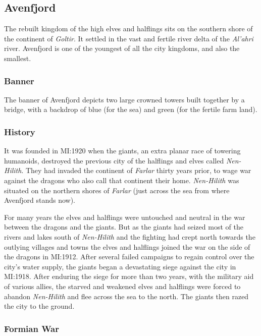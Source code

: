 \subsection*{Avenfjord}

The rebuilt kingdom of the high elves and halflings sits on the southern shore
of the continent of \emph{Goltir}. It settled in the vast and fertile river
delta of the \emph{Al'ahri} river. Avenfjord is one of the youngest of all the
city kingdoms, and also the smallest.

\subsubsection*{Banner}

The banner of Avenfjord depicts two large crowned towers built together by
a bridge, with a backdrop of blue (for the sea) and green (for the fertile
farm land).

\subsubsection*{History}

It was founded in MI:1920 when the giants, an extra planar race of towering
humanoids, destroyed the previous city of the halflings and elves called
\emph{Nen-Hilith}. They had invaded the continent of \emph{Farlar} thirty
years prior, to wage war against the dragons who also call that continent
their home. \emph{Nen-Hilith} was situated on the northern shores of
\emph{Farlar} (just across the sea from where Avenfjord stands now).

For many years the elves and halflings were untouched and neutral in the
war between the dragons and the giants. But as the giants had seized most of
the rivers and lakes south of \emph{Nen-Hilith} and the fighting had crept
north towards the outlying villages and towns the elves and halflings joined
the war on the side of the dragons in MI:1912. After several failed campaigns
to regain control over the city's water supply, the giants began a devastating
siege against the city in MI:1918. After enduring the siege for more than two
years, with the military aid of various allies, the starved and weakened elves
and halflings were forced to abandon \emph{Nen-Hilith} and flee across the sea
to the north. The giants then razed the city to the ground.

\subsubsection*{Formian War}

